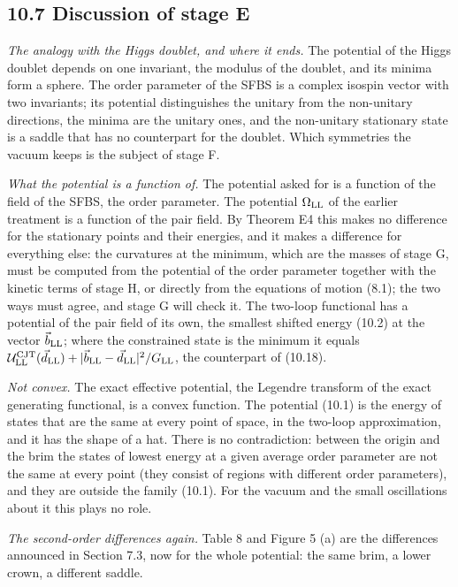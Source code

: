 \documentclass[
  10pt,
]{article}
\begin{document}
\hypertarget{discussion-of-stage-e}{%
\subsection{10.7 Discussion of stage E}\label{discussion-of-stage-e}}

\emph{The analogy with the Higgs doublet, and where it ends.} The
potential of the Higgs doublet depends on one invariant, the modulus of
the doublet, and its minima form a sphere. The order parameter of the
SFBS is a complex isospin vector with two invariants; its potential
distinguishes the unitary from the non-unitary directions, the minima
are the unitary ones, and the non-unitary stationary state is a saddle
that has no counterpart for the doublet. Which symmetries the vacuum
keeps is the subject of stage F.

\emph{What the potential is a function of.} The potential asked for is a
function of the field of the SFBS, the order parameter. The potential
\(\Omega_{\rm LL}\) of the earlier treatment is a function of the pair
field. By Theorem E4 this makes no difference for the stationary points
and their energies, and it makes a difference for everything else: the
curvatures at the minimum, which are the masses of stage G, must be
computed from the potential of the order parameter together with the
kinetic terms of stage H, or directly from the equations of motion
(8.1); the two ways must agree, and stage G will check it. The two-loop
functional has a potential of the pair field of its own, the smallest
shifted energy (10.2) at the vector \(\vec b_{\rm LL}\); where the
constrained state is the minimum it equals
\(\mathcal U^{\rm CJT}_{\rm LL}(\vec d_{\rm LL})+\lvert\vec b_{\rm LL}-\vec d_{\rm LL}\rvert^2/G_{\rm LL}\),
the counterpart of (10.18).

\emph{Not convex.} The exact effective potential, the Legendre transform
of the exact generating functional, is a convex function. The potential
(10.1) is the energy of states that are the same at every point of
space, in the two-loop approximation, and it has the shape of a hat.
There is no contradiction: between the origin and the brim the states of
lowest energy at a given average order parameter are not the same at
every point (they consist of regions with different order parameters),
and they are outside the family (10.1). For the vacuum and the small
oscillations about it this plays no role.

\emph{The second-order differences again.} Table 8 and Figure 5 (a) are
the differences announced in Section 7.3, now for the whole potential:
the same brim, a lower crown, a different saddle.
\end{document}
